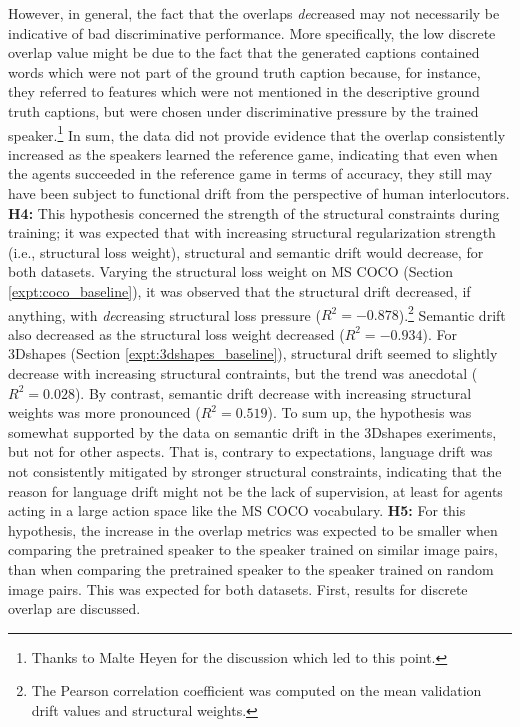 However, in general, the fact that the overlaps \emph{de}creased may not necessarily be indicative of bad discriminative performance. More specifically, the low discrete overlap value might be due to the fact that the generated captions contained words which were not part of the ground truth caption because, for instance, they referred to features which were not mentioned in the descriptive ground truth captions, but were chosen under discriminative pressure by the trained speaker.\footnote{Thanks to Malte Heyen for the discussion which led to this point.} 
In sum, the data did not provide evidence that the overlap consistently increased as the speakers learned the reference game, indicating that even when the agents succeeded in the reference game in terms of accuracy, they still may have been subject to functional drift from the perspective of human interlocutors.\newline
\textbf{H4:} This hypothesis concerned the strength of the structural constraints during training; it was expected that with increasing structural regularization strength (i.e., structural loss weight), structural and semantic drift would decrease, for both datasets. Varying the structural loss weight on MS COCO (Section \ref{expt:coco_baseline}), it was observed that the structural drift decreased, if anything, with \textit{de}creasing structural loss pressure ($R^2 = -0.878$).\footnote{The Pearson correlation coefficient was computed on the mean validation drift values and structural weights.} Semantic drift also decreased as the structural loss weight decreased ($R^2 = -0.934$). For 3Dshapes (Section \ref{expt:3dshapes_baseline}), structural drift seemed to slightly decrease with increasing structural contraints, but the trend was anecdotal ($R^2=0.028$). By contrast, semantic drift decrease with increasing structural weights was more pronounced ($R^2 = 0.519$). To sum up, the hypothesis was somewhat supported by the data on semantic drift in the 3Dshapes exeriments, but not for other aspects. That is, contrary to expectations, language drift was not consistently mitigated by stronger structural constraints, indicating that the reason for language drift might not be the lack of supervision, at least for agents acting in a large action space like the MS COCO vocabulary. \newline
\textbf{H5:} For this hypothesis, the increase in the overlap metrics was expected to be smaller when comparing the pretrained speaker to the speaker trained on similar image pairs, than when comparing the pretrained speaker to the speaker trained on random image pairs. This was expected for both datasets. First, results for discrete overlap are discussed. 
